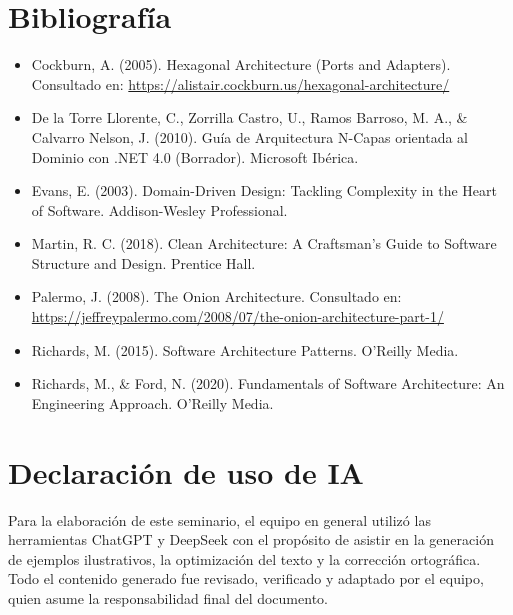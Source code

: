 \documentclass[12pt, a4paper]{article}
\begin{document}
        \section{Bibliografía}
        \begin{itemize}
            \item Cockburn, A. (2005). Hexagonal Architecture (Ports and Adapters). Consultado en: \url{https://alistair.cockburn.us/hexagonal-architecture/}
            \item De la Torre Llorente, C., Zorrilla Castro, U., Ramos Barroso, M. A., \& Calvarro Nelson, J. (2010). Guía de Arquitectura N-Capas orientada al Dominio con .NET 4.0 (Borrador). Microsoft Ibérica.
            \item Evans, E. (2003). Domain-Driven Design: Tackling Complexity in the Heart of Software. Addison-Wesley Professional.
            \item Martin, R. C. (2018). Clean Architecture: A Craftsman's Guide to Software Structure and Design. Prentice Hall.
            \item Palermo, J. (2008). The Onion Architecture. Consultado en: \url{https://jeffreypalermo.com/2008/07/the-onion-architecture-part-1/}
            \item Richards, M. (2015). Software Architecture Patterns. O'Reilly Media.
            \item Richards, M., \& Ford, N. (2020). Fundamentals of Software Architecture: An Engineering Approach. O'Reilly Media.
        \end{itemize}

        \section{Declaración de uso de IA}

        Para la elaboración de este seminario, el equipo en general utilizó las herramientas ChatGPT y DeepSeek con el propósito de asistir en la generación de ejemplos ilustrativos, la optimización del texto y la corrección ortográfica. Todo el contenido generado fue revisado, verificado y adaptado por el equipo, quien asume la responsabilidad final del documento.
\end{document}
